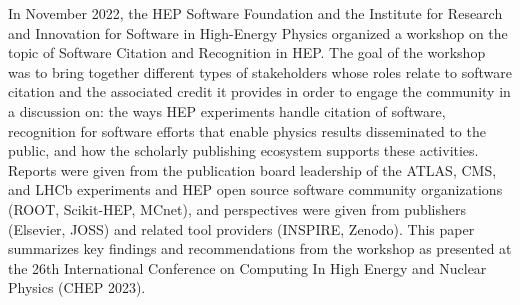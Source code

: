 In November 2022, the HEP Software Foundation and the Institute for Research and Innovation for Software in High-Energy Physics organized a workshop on the topic of Software Citation and Recognition in HEP.
The goal of the workshop was to bring together different types of stakeholders whose roles relate to software citation and the associated credit it provides in order to engage the community in a discussion on: the ways HEP experiments handle citation of software, recognition for software efforts that enable physics results disseminated to the public, and how the scholarly publishing ecosystem supports these activities.
Reports were given from the publication board leadership of the ATLAS, CMS, and LHCb experiments and HEP open source software community organizations (ROOT, Scikit-HEP, MCnet), and perspectives were given from publishers (Elsevier, JOSS) and related tool providers (INSPIRE, Zenodo).
This paper summarizes key findings and recommendations from the workshop as presented at the 26th International Conference on Computing In High Energy and Nuclear Physics (CHEP 2023).

